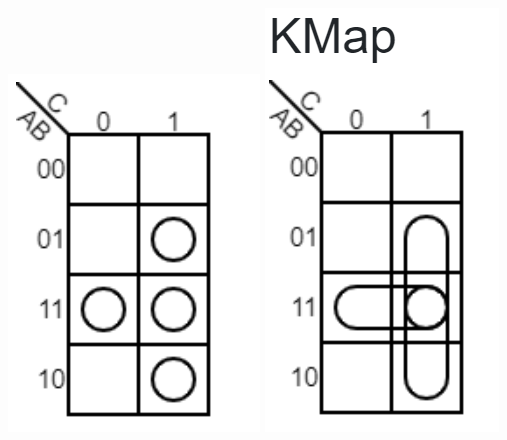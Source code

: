 \documentclass[10pt]{article}
\begin{document}
\begin{itemize}
\begin{enumerate}
\includegraphics[scale=.8]{Problem8kmap.png}
\includegraphics[scale=.8]{Problem8minimized.png}

\end{enumerate}
\end{itemize}
\end{document}
